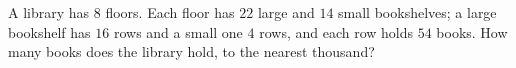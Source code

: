 A library has $8$ floors. Each floor has $22$ large and $14$ small bookshelves; a large bookshelf has $16$ rows and a small one $4$ rows, and each row holds $54$ books. How many books does the library hold, to the nearest thousand?
